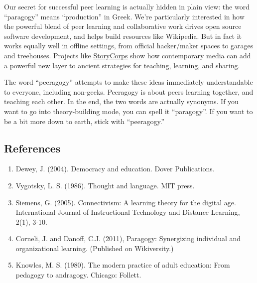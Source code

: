 Our secret for successful peer learning is actually hidden in plain
view: the word ``paragogy'' means ``production'' in Greek. We're
particularly interested in how the powerful blend of peer learning and
collaborative work drives open source software development, and helps
build resources like Wikipedia. But in fact it works equally well in
offline settings, from official hacker/maker spaces to garages and
treehouses. Projects like
\href{http://storycorps.org/about/}{StoryCorps} show how contemporary
media can add a powerful new layer to ancient strategies for teaching,
learning, and sharing.

The word ``peeragogy'' attempts to make these ideas immediately
understandable to everyone, including non-geeks. Peeragogy is about
peers learning together, and teaching each other. In the end, the two
words are actually synonyms. If you want to go into theory-building
mode, you can spell it ``paragogy''. If you want to be a bit more down
to earth, stick with ``peeragogy.''

\subsection{References}

\begin{enumerate}
\item
  Dewey, J. (2004). Democracy and education. Dover Publications.
\item
  Vygotsky, L. S. (1986). Thought and language. MIT press.
\item
  Siemens, G. (2005). Connectivism: A learning theory for the digital
  age. International Journal of Instructional Technology and Distance
  Learning, 2(1), 3-10.
\item
  Corneli, J. and Danoff, C.J. (2011), Paragogy: Synergizing individual
  and organizational learning. (Published on Wikiversity.)
\item
  Knowles, M. S. (1980). The modern practice of adult education: From
  pedagogy to andragogy. Chicago: Follett.
\end{enumerate}
